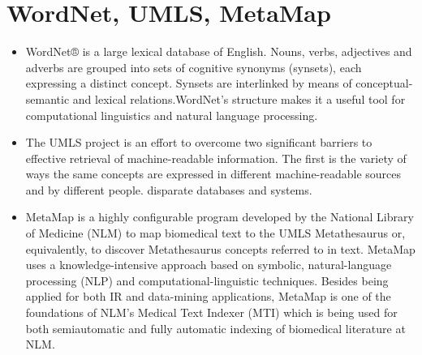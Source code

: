 \documentclass[pdftext,twoside,11pt]{article}
\begin{document}
\section{WordNet, UMLS, MetaMap}
\label{sec:intro} 
\begin{itemize}
\item WordNet® is a large lexical database of English. Nouns, verbs, adjectives and adverbs are grouped into sets of cognitive synonyms (synsets), each expressing a distinct concept. Synsets are interlinked by means of conceptual-semantic and lexical relations.WordNet's structure makes it a useful tool for computational linguistics and natural language processing.
\item The UMLS project is an effort to overcome two significant
 barriers to effective retrieval of machine-readable information.
       The first is the variety of ways the same concepts are expressed
      in different machine-readable sources and by different people. disparate databases and systems.

\item MetaMap is a highly configurable program developed by the National Library of Medicine (NLM) to map biomedical
 text to the UMLS Metathesaurus or, equivalently, to discover Metathesaurus concepts referred to in text. 
MetaMap uses a knowledge-intensive approach based on symbolic, natural-language processing (NLP) and 
computational-linguistic techniques. Besides being applied for both IR and data-mining applications, 
MetaMap is one of the foundations of NLM's Medical Text Indexer (MTI) which is being used for both 
semiautomatic and fully automatic indexing of biomedical literature at NLM. 
\end{itemize}
\end{document}
